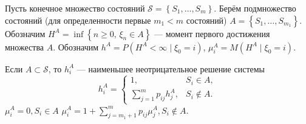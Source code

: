 \begin{definition}
  Пусть конечное множество состояний $\mathscr S = \left\{ S_1, \dots, S_m \right\} $. Берём подмножество 
  состояний (для определенности первые $m_1 < m$ состояний)
  $A = \left\{ S_1, \dots, S_{m_1} \right\} $.
  Обозначим $H^A = \inf \left\{ n\geqslant 0,\, \xi_n \in A \right\} $ --- момент первого достижения 
  множества $A$.
  Обозначим $h^A = P(H^A < \infty \mid \xi_0 = i)$,
  $\mu^A_i = M(H^A \mid \xi_0 = i)$.
\end{definition}

\begin{theorem}
  Если $A \subset \mathscr S$, то $h_i^A$ --- наименьшее неотрицательное решение системы
  \[
    h^A_i = \begin{cases}
      1, & S_i \in A, \\
      \sum_{j=1}^m p_{ij} h_j^A, &S_i \notin A.
    \end{cases}
  \]
  $\mu^A_i = 0, S_i \in A$
  $\mu^A_i = 1 + \sum_{j=m_1+1}^{m} p_{ij} \mu_j^A, S_i \notin A$.
\end{theorem}
